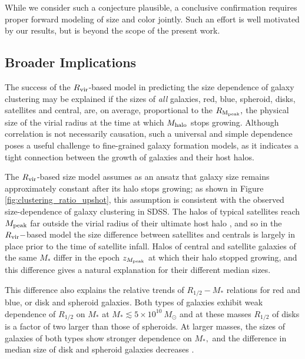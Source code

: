 \documentclass[usenatbib,usegraphicx,letterpaper]{mn2e}
\newcommand{\rhalf}{R_{1/2}}
\newcommand{\mstar}{M_{\ast}}
\newcommand{\mpeak}{M_{\rm peak}}
\newcommand{\zpeak}{z_{M_{\rm peak}}}
\newcommand{\mhalo}{M_{\rm halo}}
\newcommand{\rvir}{R_{\rm vir}}
\newcommand{\rmpeak}{R_{\rm M_{peak}}}
\begin{document}
While we consider such a conjecture plausible, a conclusive confirmation requires proper forward modeling of size and color jointly. Such an effort is well motivated by our results, but is beyond the scope of the present work.

\subsection{Broader Implications}
\label{subsec:broader_implications}

The success of the $\rvir$-based model in predicting the size dependence of galaxy clustering may be explained if the sizes of {\it all} galaxies, red, blue, spheroid, disks, satellites and central, are, on average, proportional to the $\rmpeak,$ the physical size of the virial radius at the time at which $\mhalo$ stops growing. Although correlation is not necessarily causation, such a universal and simple dependence poses a useful challenge to fine-grained galaxy formation models, as it indicates a tight connection between the growth of galaxies and their host halos.

The $\rvir$-based size model assumes as an ansatz that galaxy size remains approximately constant after its halo stops growing; as shown in Figure \ref{fig:clustering_ratio_upshot}, this assumption is consistent with the observed size-dependence of galaxy clustering in SDSS.  The halos of typical satellites reach $\mpeak$ far outside the virial radius of their ultimate host halo \citep{behroozi_etal14}, and so in the $\rvir-$based model the size difference between satellites and centrals is largely in place prior to the time of satellite infall. Halos of central and satellite galaxies of the same $\mstar$ differ in the epoch $\zpeak$ at which their halo stopped growing, and this difference gives a natural explanation for their different median sizes.

This difference also explains the relative trends of $\rhalf-\mstar$ relations for red and blue, or disk and spheroid galaxies.
Both types of galaxies exhibit weak dependence of $\rhalf$ on $\mstar$ at $\mstar\lesssim 5\times 10^{10}\ M_\odot$ and
at these masses $\rhalf$ of disks is a factor of two larger than those of spheroids. At larger masses, the sizes of galaxies of both types show stronger dependence on $\mstar,$ and the difference in median size of disk and spheroid galaxies decreases \citep[e.g.,][]{bernardi_etal14}.
\end{document}
